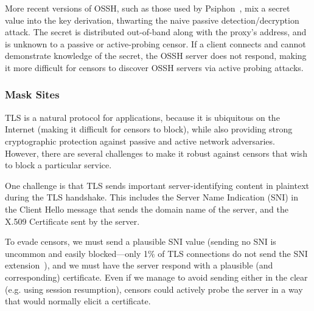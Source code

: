 \documentclass[sigconf,anonymous]{acmart}
\begin{document}
More recent versions of OSSH, such as those used by Psiphon~\cite{psiphon}, mix a secret
value into the key derivation, thwarting the naive passive detection/decryption
attack. The secret is distributed out-of-band along with the proxy's address,
and is unknown to a passive or active-probing censor. If a client connects and cannot
demonstrate knowledge of
the secret, the OSSH server does not respond, making it more difficult for
censors to discover OSSH servers via active probing attacks.


%
%

\subsubsection{Mask Sites}
\label{sec:mask-sites}

TLS is a natural protocol for \scheme applications, because it is ubiquitous on
the Internet (making it difficult for censors to block), while also providing
strong cryptographic protection against passive and active network adversaries.
However, there are several challenges to make it robust against censors that
wish to block a particular service.

One challenge is that TLS sends important server-identifying content in plaintext
during the TLS handshake. This includes the Server Name Indication (SNI) in the
Client Hello message that sends the domain name of the server, and the
X.509 Certificate sent by the server.

To evade censors, we must send a plausible SNI value (sending no SNI is
uncommon and easily blocked---only 1\% of TLS connections
do not send the SNI extension~\cite{tls-fingerprint}), and we must have the server respond with
a plausible (and corresponding) certificate. Even if we manage to avoid sending
either in the clear (e.g. using session resumption), censors could actively probe
the server in a way that would normally elicit a certificate.
\end{document}
